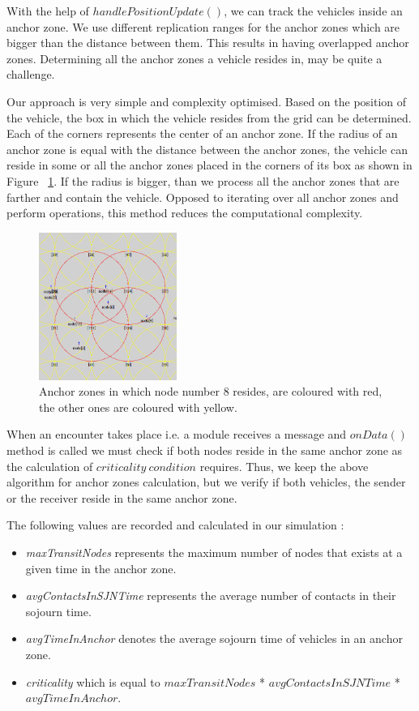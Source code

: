 With the help of $handlePositionUpdate()$, we can track the vehicles inside an
anchor zone. We use different replication ranges for the anchor zones which are
bigger than the distance between them. This results in having overlapped anchor
zones. Determining all the anchor zones a vehicle resides in, may be quite a
challenge.

Our approach is very simple and complexity optimised. Based on the position of
the vehicle, the box in which the vehicle resides from the grid can be
determined. Each of the corners represents the center of an anchor zone. If the
radius of an anchor zone is equal with the distance between the anchor zones,
the vehicle can reside in some or all the anchor zones placed in the corners of
its box as shown in Figure ~\ref{fig:node_az}. If the radius is bigger, than we
process all the anchor zones that are farther and contain the vehicle.
Opposed to iterating over all anchor zones and perform operations, this method
reduces the computational complexity.

\begin{figure}[t]
	\centering
	\includegraphics[width=0.4\textwidth]{img/node_az}
	\caption{Anchor zones in which node number 8 resides, are coloured with red,
	the other ones are coloured with yellow.}
	\label{fig:node_az}
\end{figure}

When an encounter takes place i.e. a module receives a message and $onData()$
method is called we must check if both nodes reside in the same anchor zone as
the calculation of $criticality\ condition$ requires. Thus, we keep the above
algorithm for anchor zones calculation, but we verify if both vehicles, the
sender or the receiver reside in the same anchor zone.

The following values are recorded and calculated in our simulation :
\begin{itemize}
	\item {\it maxTransitNodes} represents the maximum number of nodes that exists
	at a given time in the anchor zone.
	\item {\it avgContactsInSJNTime} represents the average number of contacts in
	their sojourn time.
	\item {\it avgTimeInAnchor} denotes the average sojourn time of vehicles in an
	anchor zone.
	\item {\it criticality} which is equal to $maxTransitNodes$ *
	$avgContactsInSJNTime$ * $avgTimeInAnchor$.
\end{itemize}


